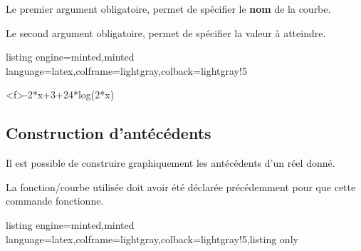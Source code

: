 \documentclass[11pt,a4paper]{ltxdoc}
\begin{document}
\smallskip

Le premier argument obligatoire, permet de spécifier le \textbf{nom} de la courbe.

\smallskip

Le second argument obligatoire, permet de spécifier la valeur à atteindre.

\begin{tcblisting}{listing engine=minted,minted language=latex,colframe=lightgray,colback=lightgray!5}
\begin{GraphiqueTikz}%
	[x=0.9cm,y=0.425cm,Xmin=4,Xmax=20,Origx=4,
	Ymin=40,Ymax=56,Ygrille=2,Ygrilles=1,Origy=40]
	{-2*x+3+24*log(2*x)}
\end{GraphiqueTikz}
\end{tcblisting}

%
%

\pagebreak

\subsection{Construction d'antécédents}\label{tracanteced}

Il est possible de construire graphiquement les antécédents d'un réel donné.

La fonction/courbe utilisée doit avoir été déclarée précédemment pour que cette commande fonctionne.

\begin{tcblisting}{listing engine=minted,minted language=latex,colframe=lightgray,colback=lightgray!5,listing only}
\end{tcblisting}
\end{document}
